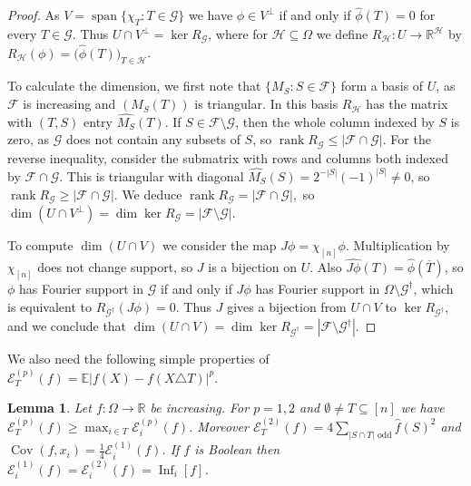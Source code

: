 \documentclass{article}
\theoremstyle{plain}
\newtheorem{lemma}[theo]{Lemma}
\theoremstyle{definition}
\newcommand{\mc}[1]{\mathcal{#1}}
\newcommand{\mb}[1]{\mathbb{#1}}
\newcommand{\sub}{\subseteq}
\newcommand{\sm}{\setminus}
\newcommand{\ov}{\overline}
\newcommand{\es}{\emptyset}
\newcommand{\cE}{\mathcal E}
\newcommand{\OO}{\Omega}
\newcommand{\on}{\operatorname}
\begin{document}
\begin{proof}
As $V=\operatorname{span}\{\chi_T:T\in\mc G\}$
we have $\phi \in V^\perp$ if and only if $\widehat\phi(T)=0$ for every $T\in\mc G$.
Thus $U\cap V^\perp=\ker R_{\mc G}$, where for  $\mc H\sub\OO$ we define
\(R_{\mc H}:U\longrightarrow \mb R^{\mc H}\) 
by \(R_{\mc H}(\phi)=\bigl(\widehat\phi(T)\bigr)_{T\in\mc H}\).

To calculate the dimension, we first note that $\{M_S:S\in\mc F\}$ form a basis of $U$,
as $\mc F$ is increasing and $(M_S(T))$ is triangular. In this basis $R_{\mc H}$
has the matrix with $(T,S)$ entry $\widehat{M_S}(T)$.
If $S\in\mc F\sm\mc G$, then the whole column indexed by $S$ is zero,
as $\mc{G}$ does not contain any subsets of $S$, so
\(
 \operatorname{rank}R_{\mc G}\le |\mc F\cap\mc G|.
\)
For the reverse inequality, consider the submatrix
with rows and columns both indexed by $\mc F\cap\mc G$. 
This is triangular with diagonal $ \widehat{M_S}(S)=2^{-|S|}(-1)^{|S|}\ne0$, so
\(
 \operatorname{rank}R_{\mc G}\ge |\mc F\cap\mc G|.
\)
We deduce 
\(
 \operatorname{rank}R_{\mc G}=|\mc F\cap\mc G|,
\)
so
\(
 \dim(U\cap V^\perp)
 =\dim\ker R_{\mc G}
 =|\mc F\sm\mc G|.
\)

To compute $\dim(U\cap V)$ we consider the map
\(
 J\phi=\chi_{[n]}\phi.
\)
Multiplication by $\chi_{[n]}$ does not change support,
so $J$ is a bijection on $U$.
Also  $\widehat{J\phi}(T)=\widehat\phi(\ov T)$,
so $\phi$ has Fourier support in $\mc G$ if
and only if $J\phi$ has Fourier support in $\OO\sm\mc G^\dagger$,
which is equivalent to $R_{\mc G^\dagger}(J\phi)=0$.
Thus $J$ gives a bijection from $U\cap V$ to $\ker R_{\mc G^\dagger}$, and we conclude that
\(
 \dim(U\cap V)
 =\dim\ker R_{\mc G^\dagger}
 =|\mc F\sm\mc G^\dagger|.
\)
\end{proof}

We also need the following simple  properties of $\cE_T^{(p)}(f)=\mb E|f(X)-f(X\triangle T)|^p$.

\begin{lemma}\label{lem:flip-energy}
Let $f:\OO\to\mb R$ be increasing.  For $p=1,2$ and $\es \ne T\sub[n]$ we have
$\cE_T^{(p)}(f)\ge\max_{i\in T}\cE_i^{(p)}(f)$.  Moreover
$\cE_T^{(2)}(f)=4\sum_{|S\cap T|\text{ odd}}\widehat f(S)^2$ and
$\on{Cov}(f,x_i)=\frac14\cE_i^{(1)}(f)$.  If $f$ is Boolean then
$\cE_i^{(1)}(f)=\cE_i^{(2)}(f)=\on{Inf}_i[f]$.
\end{lemma}
\end{document}
